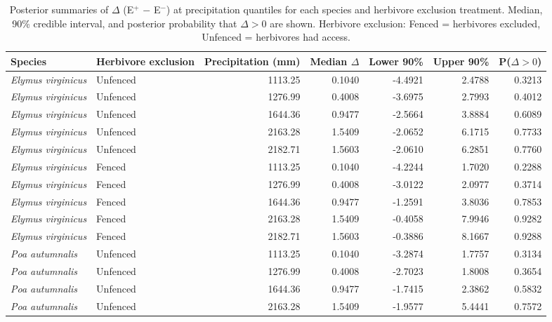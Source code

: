 \documentclass[12pt]{article}\usepackage[]{graphicx}\usepackage[dvipsnames]{xcolor}
\begin{document}
\begin{landscape}
\begin{table}[ht]
\centering
\small
\caption[Summaries of $\Delta$ (E$^{+}$ $-$ E$^{-}$) for inflorescences across precipitation quantiles]{Posterior summaries of $\Delta$ (E$^{+}$ $-$ E$^{-}$) at precipitation quantiles for each species and herbivore exclusion treatment. 
Median, 90\% credible interval, and posterior probability that $\Delta > 0$ are shown. 
Herbivore exclusion: Fenced = herbivores excluded, Unfenced = herbivores had access.}
\label{tab:delta_summary_spike}
\begin{tabular}{llrrrrr}
\hline
Species & Herbivore exclusion & Precipitation (mm) & Median $\Delta$  & Lower 90\% & Upper 90\% & P($\Delta>0$) \\
\hline
\textit{Elymus virginicus} & Unfenced & 1113.25 & 0.1040  & -4.4921 & 2.4788 & 0.3213 \\
\textit{Elymus virginicus} & Unfenced & 1276.99 & 0.4008  & -3.6975 & 2.7993 & 0.4012 \\
\textit{Elymus virginicus} & Unfenced & 1644.36 & 0.9477  & -2.5664 & 3.8884 & 0.6089 \\
\textit{Elymus virginicus} & Unfenced & 2163.28 & 1.5409  & -2.0652 & 6.1715 & 0.7733 \\
\textit{Elymus virginicus} & Unfenced & 2182.71 & 1.5603  & -2.0610 & 6.2851 & 0.7760 \\
\textit{Elymus virginicus} & Fenced   & 1113.25 & 0.1040  & -4.2244 & 1.7020 & 0.2288 \\
\textit{Elymus virginicus} & Fenced   & 1276.99 & 0.4008  & -3.0122 & 2.0977 & 0.3714 \\
\textit{Elymus virginicus} & Fenced   & 1644.36 & 0.9477  & -1.2591 & 3.8036 & 0.7853 \\
\textit{Elymus virginicus} & Fenced   & 2163.28 & 1.5409  & -0.4058 & 7.9946 & 0.9282 \\
\textit{Elymus virginicus} & Fenced   & 2182.71 & 1.5603  & -0.3886 & 8.1667 & 0.9288 \\
\textit{Poa autumnalis}    & Unfenced & 1113.25 & 0.1040  & -3.2874 & 1.7757 & 0.3134 \\
\textit{Poa autumnalis}    & Unfenced & 1276.99 & 0.4008  & -2.7023 & 1.8008 & 0.3654 \\
\textit{Poa autumnalis}    & Unfenced & 1644.36 & 0.9477  & -1.7415 & 2.3862 & 0.5832 \\
\textit{Poa autumnalis}    & Unfenced & 2163.28 & 1.5409  & -1.9577 & 5.4441 & 0.7572 \\

\end{tabular}
\end{table}
\end{landscape}
\end{document}
